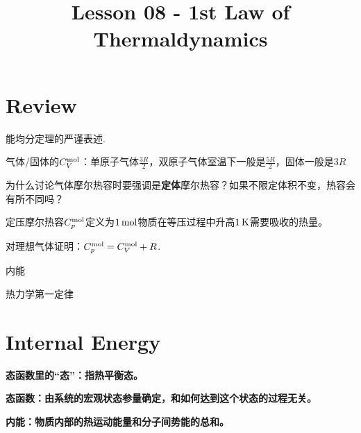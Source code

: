\documentclass[CJK]{beamer}
\title{Lesson 08 - 1st Law of Thermaldynamics}
\author{}
\date{}
\begin{document}


\section{Review}

\begin{frame}
\bch
{\large
\bitem
\item{能均分定理的严谨表述.}
\item{气体/固体的$C_V^{\rm mol}$：单原子气体$\frac{3R}{2}$，双原子气体室温下一般是$\frac{5R}{2}$，固体一般是$3R$}
\eitem
}
\ech
\end{frame}


\begin{frame}
\bch


{\large
  为什么讨论气体摩尔热容时要强调是{\bf 定体}摩尔热容？如果不限定体积不变，热容会有所不同吗？
  
}
\ech
\end{frame}


\begin{frame}
\bch
{\large
  {\blue 定压摩尔热容$C_p^{\rm mol}$定义为$1\,\mathrm{mol}$物质在等压过程中升高$1\,\mathrm{K}$需要吸收的热量。}

  
  对理想气体证明：$C_p^{\rm mol} = C_V^{\rm mol} + R$.
  
}
\ech
\end{frame}


\begin{frame}
\bch
\bitem
\item{内能}
\item{热力学第一定律}
\eitem
\ech
\end{frame}


\section{Internal Energy}


\begin{frame}
\bch
{\large
\bitem
\item{\bf 态函数里的“态”：指热平衡态。}
\item{\bf 态函数：由系统的宏观状态参量确定，和如何达到这个状态的过程无关。}
\item{\bf 内能：物质内部的热运动能量和分子间势能的总和。}  
\eitem
}
\ech
\end{frame}
\end{document}
